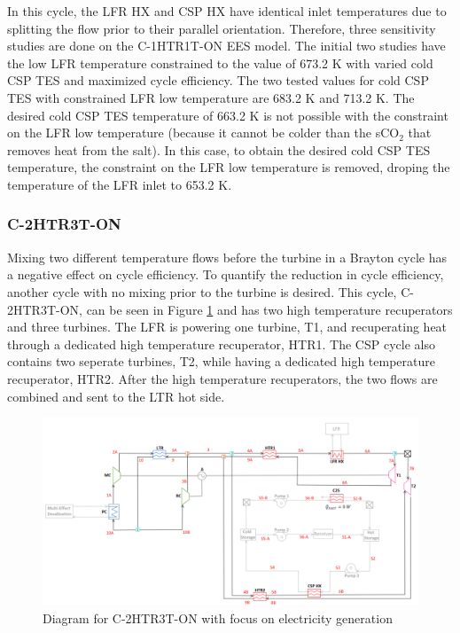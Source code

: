 \begin{paracol}{2}
\linenumbers
\switchcolumn

In this cycle, the LFR HX and CSP HX have identical inlet temperatures due to splitting the flow prior to their parallel orientation. Therefore, three sensitivity studies are done on the C-1HTR1T-ON EES model. The initial two studies have the low LFR temperature constrained to the value of 673.2 K with varied cold CSP TES and maximized cycle efficiency. The two tested values for cold CSP TES with constrained LFR low temperature are 683.2 K and 713.2 K. The desired cold CSP TES temperature of 663.2 K is not possible with the constraint on the LFR low temperature (because it cannot be colder than the sCO$_2$ that removes heat from the salt). In this case, to obtain the desired cold CSP TES temperature, the constraint on the LFR low temperature is removed, droping the temperature of the LFR inlet to 653.2 K. 


\subsubsection{C-2HTR3T-ON} 

Mixing two different temperature flows before the turbine in a Brayton cycle has a negative effect on cycle efficiency. To quantify the reduction in cycle efficiency, another cycle with no mixing prior to the turbine is desired. This cycle, C-2HTR3T-ON, can be seen in Figure \ref{c-2htr3t-on} and has two high temperature recuperators and three turbines. The LFR is powering one turbine, T1, and recuperating heat through a dedicated high temperature recuperator, HTR1. The CSP cycle also contains two seperate turbines, T2, while having a dedicated high temperature recuperator, HTR2. After the high temperature recuperators, the two flows are combined and sent to the LTR hot side. 

\end{paracol}
\begin{figure}[H]
    \widefigure
    \includegraphics[width=\linewidth]{Definitions/c-2htr3t-on.pdf}
    \caption{Diagram for C-2HTR3T-ON with focus on electricity generation\label{c-2htr3t-on}}
\end{figure}
